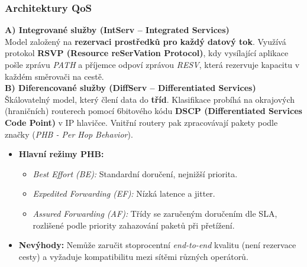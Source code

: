     \subsubsection{Architektury QoS}
        \textbf{A) Integrované služby (IntServ -- Integrated Services)}\\
        Model založený na \textbf{rezervaci prostředků pro každý datový tok}. Využívá protokol \textbf{RSVP (Resource reSerVation Protocol)}, kdy vysílající aplikace pošle zprávu \textit{PATH} a příjemce odpoví zprávou \textit{RESV}, která rezervuje kapacitu v každém směrovači na cestě.
        \\
        \textbf{B) Diferencované služby (DiffServ -- Differentiated Services)}\\
        Škálovatelný model, který člení data do \textbf{tříd}. Klasifikace probíhá na okrajových (hraničních) routerech pomocí 6bitového kódu \textbf{DSCP (Differentiated Services Code Point)} v IP hlavičce. Vnitřní routery pak zpracovávají pakety podle značky (\textit{PHB - Per Hop Behavior}).
        \begin{itemize}
            \item \textbf{Hlavní režimy PHB:}
            \begin{itemize}
                \item \textit{Best Effort (BE):} Standardní doručení, nejnižší priorita.
                \item \textit{Expedited Forwarding (EF):} Nízká latence a jitter.
                \item \textit{Assured Forwarding (AF):} Třídy se zaručeným doručením dle SLA, rozlišené podle priority zahazování paketů při přetížení.
            \end{itemize}
            \item \textbf{Nevýhody:} Nemůže zaručit stoprocentní \textit{end-to-end} kvalitu (není rezervace cesty) a vyžaduje kompatibilitu mezi sítěmi různých operátorů.
        \end{itemize}
